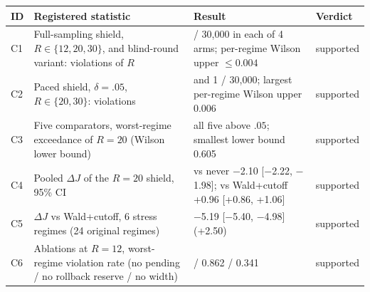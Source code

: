 \begin{tabular}{@{}l >{\raggedright\arraybackslash}p{4.8cm} >{\raggedright\arraybackslash}p{7.2cm} l@{}}
\toprule
ID & Registered statistic & Result & Verdict \\
\midrule
C1 & Full-sampling shield, $R\in\{12,20,30\}$, and blind-round variant: violations of $R$ & 0 / 30{,}000 in each of 4 arms; per-regime Wilson upper $\le 0.004$ & supported \\
C2 & Paced shield, $\delta=.05$, $R\in\{20,30\}$: violations & 1 and 1 / 30{,}000; largest per-regime Wilson upper 0.006 & supported \\
C3 & Five comparators, worst-regime exceedance of $R=20$ (Wilson lower bound) & all five above $.05$; smallest lower bound 0.605 & supported \\
C4 & Pooled $\Delta J$ of the $R=20$ shield, 95\% CI & vs never $-$2.10 [$-$2.22, $-$1.98]; vs Wald+cutoff +0.96 [+0.86, +1.06] & supported \\
C5 & $\Delta J$ vs Wald+cutoff, 6 stress regimes (24 original regimes) & $-$5.19 [$-$5.40, $-$4.98] (+2.50) & supported \\
C6 & Ablations at $R=12$, worst-regime violation rate (no pending / no rollback reserve / no width) & 0.940 / 0.862 / 0.341 & supported \\
\bottomrule
\end{tabular}
